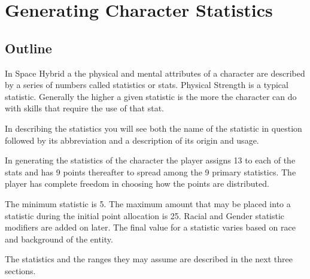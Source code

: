 \chapter{Generating Character Statistics}

\section{Outline}

In Space Hybrid a the physical and mental attributes of a character 
are described by a series of numbers called statistics or stats. 
Physical Strength is a typical statistic. Generally the higher a
given statistic is the more the character can do with skills that 
require the use of that stat. 

In describing the statistics you will see both the name of the 
statistic in question followed by its abbreviation and a description of
its origin and usage. 

In generating the statistics of the character the player assigns 13 to
each of the stats and has 9 points thereafter to spread among
the 9 primary statistics. The player has complete freedom in choosing 
how the points are distributed.  

The minimum statistic is 5. The maximum amount that may be placed into
a statistic during the initial point allocation is 25. Racial and 
Gender statistic modifiers are added on later. The final value for a
statistic varies based on race and background of the entity.

The statistics and the ranges they may assume are described in the 
next three sections.


